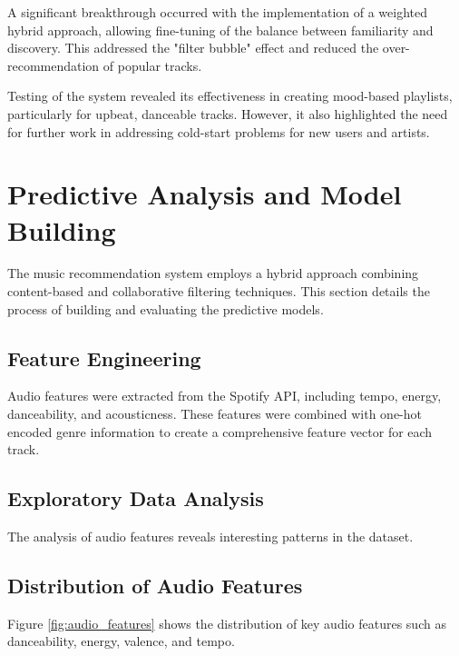 \documentclass[runningheads]{llncs}
\begin{document}
A significant breakthrough occurred with the implementation of a weighted hybrid approach, allowing fine-tuning of the balance between familiarity and discovery. This addressed the "filter bubble" effect and reduced the over-recommendation of popular tracks.

Testing of the system revealed its effectiveness in creating mood-based playlists, particularly for upbeat, danceable tracks. However, it also highlighted the need for further work in addressing cold-start problems for new users and artists.

\section{Predictive Analysis and Model Building}

The music recommendation system employs a hybrid approach combining content-based and collaborative filtering techniques. This section details the process of building and evaluating the predictive models.

\subsection{Feature Engineering}

Audio features were extracted from the Spotify API, including tempo, energy, danceability, and acousticness. These features were combined with one-hot encoded genre information to create a comprehensive feature vector for each track.

\subsection{Exploratory Data Analysis}

The analysis of audio features reveals interesting patterns in the dataset.

\subsection{Distribution of Audio Features}

Figure \ref{fig:audio_features} shows the distribution of key audio features such as danceability, energy, valence, and tempo.
\end{document}
